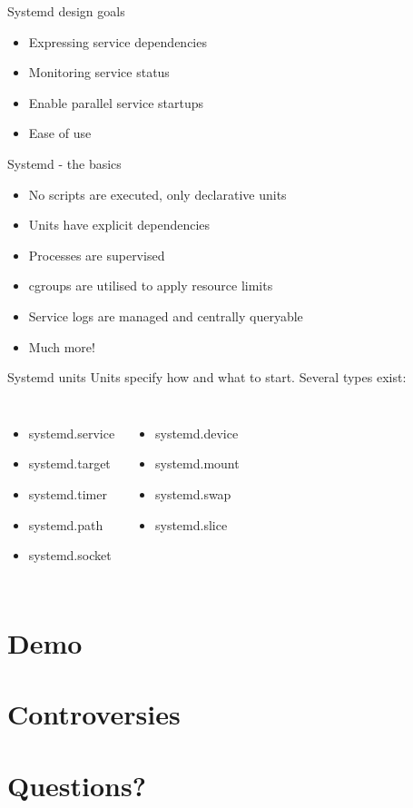 \documentclass[14pt]{beamer}
\newenvironment{code}{\ttfamily}{\par}
\begin{document}
\begin{frame}{Systemd design goals}
  \begin{itemize}
  \item Expressing service dependencies
  \item Monitoring service status
  \item Enable parallel service startups
  \item Ease of use
  \end{itemize}
\end{frame}

\begin{frame}{Systemd - the basics}
  \begin{itemize}
    \item No scripts are executed, only declarative units
    \item Units have explicit dependencies
    \item Processes are supervised
    \item cgroups are utilised to apply resource limits
    \item Service logs are managed and centrally queryable
    \item Much more!
  \end{itemize}
\end{frame}

\begin{frame}{Systemd units}
  Units specify how and what to start. Several types exist:
  \begin{code}
    \small
    \begin{columns}[T,onlytextwidth]
        \begin{itemize}
          \item systemd.service
          \item systemd.target
          \item systemd.timer
          \item systemd.path
          \item systemd.socket
        \end{itemize}
        \begin{itemize}
          \item systemd.device
          \item systemd.mount
          \item systemd.swap
          \item systemd.slice
        \end{itemize}
    \end{columns}
  \end{code}
\end{frame}

\begin{frame}{}
\end{frame}

\section{Demo}

\section{Controversies}

\section{Questions?}
\end{document}
